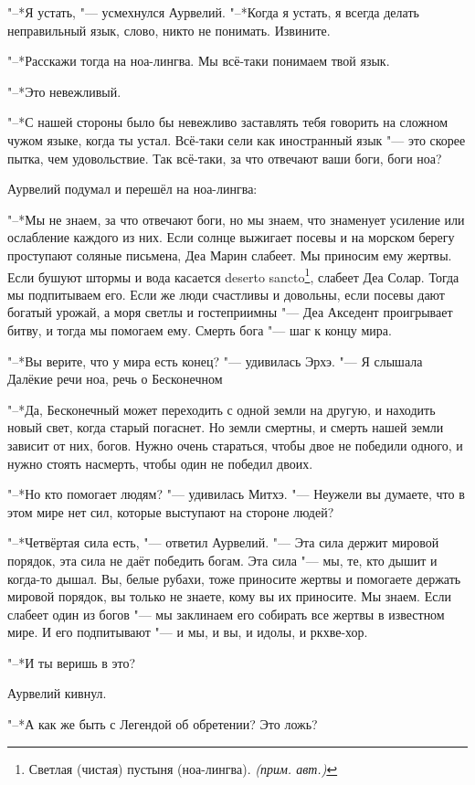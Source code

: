 \documentclass[a4paper,10pt,fleqn]{book}
\newcommand{\ldotst}{\so{...}\xspace}
\newcommand{\authornote}{\textit{(прим. авт.)}}
\begin{document}
"--*Я устать, "--- усмехнулся Аурвелий.
"--*Когда я устать, я всегда\ldotst делать\ldotst неправильный язык, слово, никто не понимать.
Извините.

"--*Расскажи тогда на ноа-лингва.
Мы всё-таки понимаем твой язык.

"--*Это невежливый.

"--*С нашей стороны было бы невежливо заставлять тебя говорить на сложном чужом языке, когда ты устал.
Всё-таки сели как иностранный язык "--- это скорее пытка, чем удовольствие.
Так всё-таки, за что отвечают ваши боги, боги ноа?

Аурвелий подумал и перешёл на ноа-лингва:

"--*Мы не знаем, за что отвечают боги, но мы знаем, что знаменует усиление или ослабление каждого из них.
Если солнце выжигает посевы и на морском берегу проступают соляные письмена, Деа Марин слабеет.
Мы приносим ему жертвы.
Если бушуют штормы и вода касается deserto sancto\footnote
{Светлая (чистая) пустыня (ноа-лингва). \authornote},
слабеет Деа Солар.
Тогда мы подпитываем его.
Если же люди счастливы и довольны, если посевы дают богатый урожай, а моря светлы и гостеприимны "--- Деа Акседент проигрывает битву, и тогда мы помогаем ему.
Смерть бога "--- шаг к концу мира.

"--*Вы верите, что у мира есть конец? "--- удивилась Эрхэ.
"--- Я слышала Далёкие речи ноа, речь о Бесконечном\ldotst

"--*Да, Бесконечный может переходить с одной земли на другую, и находить новый свет, когда старый погаснет.
Но земли смертны, и смерть нашей земли зависит от них, богов.
Нужно очень стараться, чтобы двое не победили одного, и нужно стоять насмерть, чтобы один не победил двоих.

"--*Но кто помогает людям? "--- удивилась Митхэ.
"--- Неужели вы думаете, что в этом мире нет сил, которые выступают на стороне людей?

"--*Четвёртая сила есть, "--- ответил Аурвелий.
"--- Эта сила держит мировой порядок, эта сила не даёт победить богам.
Эта сила "--- мы, те, кто дышит и когда-то дышал.
Вы, белые рубахи, тоже приносите жертвы и помогаете держать мировой порядок, вы только не знаете, кому вы их приносите.
Мы знаем.
Если слабеет один из богов "--- мы заклинаем его собирать все жертвы в известном мире.
И его подпитывают "--- и мы, и вы, и идолы, и ркхве-хор.

"--*И ты веришь в это?

Аурвелий кивнул.

"--*А как же быть с Легендой об обретении?
Это ложь?
\end{document}
